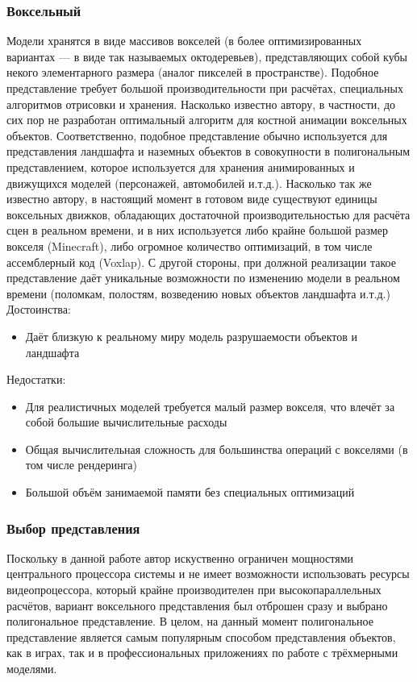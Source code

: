 \documentclass[a4paper,12pt]{report}
\numberwithin{equation}{section}
\begin{document}
\subsubsection*{Воксельный}
Модели хранятся в виде массивов вокселей (в более оптимизированных вариантах --- в виде так называемых октодеревьев), представляющих собой кубы некого элементарного размера (аналог пикселей в пространстве). Подобное представление требует большой производительности при расчётах, специальных алгоритмов отрисовки и хранения. Насколько известно автору, в частности, до сих пор не разработан оптимальный алгоритм для костной анимации воксельных объектов. Соответственно, подобное представление обычно используется для представления ландшафта и наземных объектов в совокупности в полигональным представлением, которое используется для хранения анимированных и движущихся моделей (персонажей, автомобилей и.т.д.). Насколько так же известно автору, в настоящий момент в готовом виде существуют единицы воксельных движков, обладающих достаточной производительностью для расчёта сцен в реальном времени, и в них используется либо крайне большой размер вокселя (Minecraft), либо огромное количество оптимизаций, в том числе ассемблерный код (Voxlap). С другой стороны, при должной реализации такое представление даёт уникальные возможности по изменению модели в реальном времени (поломкам, полостям, возведению новых объектов ландшафта и.т.д.) \\
Достоинства:
\begin{itemize}
\item Даёт близкую к реальному миру модель разрушаемости объектов и ландшафта
\end{itemize}
Недостатки:
\begin{itemize}
\item Для реалистичных моделей требуется малый размер вокселя, что влечёт за собой большие вычислительные расходы
\item Общая вычислительная сложность для большинства операций с вокселями (в том числе рендеринга)
\item Большой объём занимаемой памяти без специальных оптимизаций
\end{itemize}

\subsubsection*{Выбор представления}
Поскольку в данной работе автор искуственно ограничен мощностями центрального процессора системы и не имеет возможности использовать ресурсы видеопроцессора, который крайне производителен при высокопараллельных расчётов, вариант воксельного представления был отброшен сразу и выбрано полигональное представление. В целом, на данный момент полигональное представление является самым популярным способом представления объектов, как в играх, так и в профессиональных приложениях по работе с трёхмерными моделями.
\end{document}
